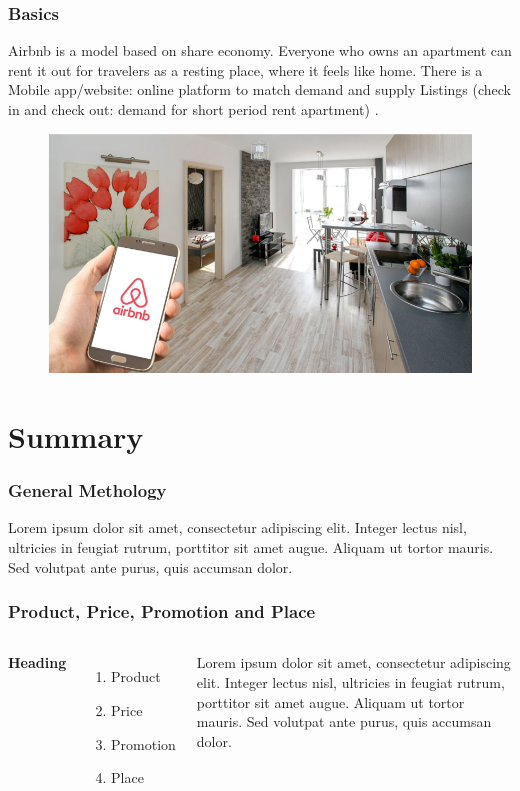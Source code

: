 \documentclass{beamer}
\begin{document}

\begin{frame}
\frametitle{Basics}
Airbnb is a model based on share economy. Everyone who owns an apartment can rent it out for travelers as a resting place, where it feels like home. There is a Mobile app/website: online platform to match demand and supply Listings (check in and check out: demand for short period rent apartment) .
\begin{figure}
\includegraphics[width=0.4\linewidth]{basics1}
\end{figure}
\end{frame}


\section{Summary}

\begin{frame}
\frametitle{General Methology}
Lorem ipsum dolor sit amet, consectetur adipiscing elit. Integer lectus nisl, ultricies in feugiat rutrum, porttitor sit amet augue. Aliquam ut tortor mauris. Sed volutpat ante purus, quis accumsan dolor.
\end{frame}

\begin{frame}
\frametitle{Product, Price, Promotion and Place}
\begin{columns}[c] %

\textbf{Heading}
\begin{enumerate}
\item Product
\item Price
\item Promotion
\item Place
\end{enumerate}

Lorem ipsum dolor sit amet, consectetur adipiscing elit. Integer lectus nisl, ultricies in feugiat rutrum, porttitor sit amet augue. Aliquam ut tortor mauris. Sed volutpat ante purus, quis accumsan dolor.

\end{columns}
\end{frame}
\end{document}
